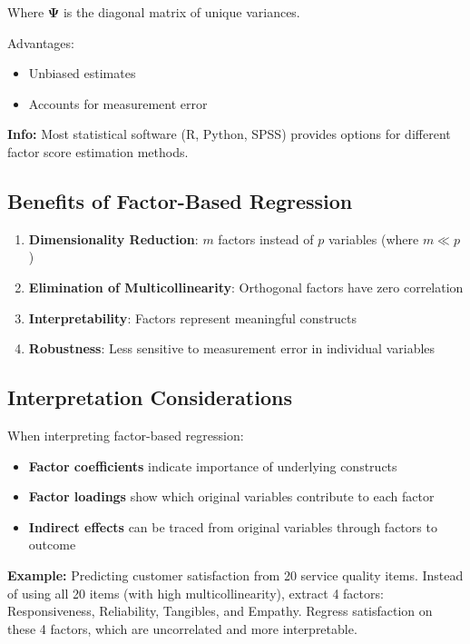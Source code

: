 \documentclass[
]{article}
\begin{document}
Where \(\mathbf{\Psi}\) is the diagonal matrix of unique variances.

Advantages:

\begin{itemize}
\item
  Unbiased estimates
\item
  Accounts for measurement error
\end{itemize}

\textbf{Info: } Most statistical software (R, Python, SPSS) provides
options for different factor score estimation methods.

\textbf{ }

\subsection{Benefits of Factor-Based Regression}

\begin{enumerate}
\item
  \textbf{Dimensionality Reduction}: \(m\) factors instead of \(p\)
  variables (where \(m \ll p\))
\item
  \textbf{Elimination of Multicollinearity}: Orthogonal factors have
  zero correlation
\item
  \textbf{Interpretability}: Factors represent meaningful constructs
\item
  \textbf{Robustness}: Less sensitive to measurement error in individual
  variables
\end{enumerate}

\textbf{ }

\subsection{Interpretation Considerations}

When interpreting factor-based regression:

\begin{itemize}
\item
  \textbf{Factor coefficients} indicate importance of underlying
  constructs
\item
  \textbf{Factor loadings} show which original variables contribute to
  each factor
\item
  \textbf{Indirect effects} can be traced from original variables
  through factors to outcome
\end{itemize}

\textbf{Example: } Predicting customer satisfaction from 20 service
quality items. Instead of using all 20 items (with high
multicollinearity), extract 4 factors: Responsiveness, Reliability,
Tangibles, and Empathy. Regress satisfaction on these 4 factors, which
are uncorrelated and more interpretable.
\end{document}
